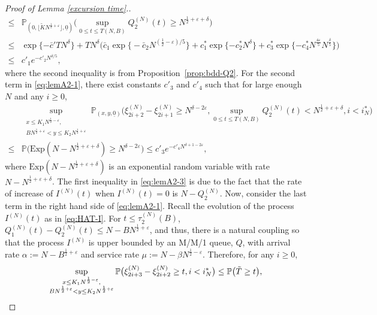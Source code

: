 \documentclass[11pt, reqno]{article}
\numberwithin{equation}{section}
\numberwithin{theorem}{section}
\begin{document}
\begin{appendix}
\begin{proof}[Proof of Lemma \ref{excursion time}.]
\begin{align}
    \leq& \mathbb{P}_{(0,\lfloor \tilde K N^{\frac{1}{2} + \varepsilon}\rfloor,\underline{0})}\Big(\sup_{0\leq t\leq T(N,B)} Q^{(N)}_2(t)\geq N^{\frac{1}{2}+\varepsilon+\delta}\Big)\nonumber\\
    \leq& \exp\{-\bar{c}'TN^{\delta}\}+TN^{\delta}\big(\bar{c}_1\exp \big\{-\bar{c}_2N^{(\frac{1}{2}-\varepsilon)/5}\big\}+c^*_1\exp\{-c^*_2N^{\delta}\}+c^*_3\exp\{-c^*_4N^{\frac{4\varepsilon}{5}}N^{\frac{\delta}{5}}\}\big)\nonumber\\
     \leq& c'_1e^{-c'_2N^{\delta/5}},
\end{align}
where the second inequality is from Proposition~\ref{prop:bdd-Q2}. For the second term in \eqref{eq:lemA2-1}, there exist constants $c'_3$ and $c'_4$ such that for large enough $N$ and any $i \ge 0$,
\begin{align}\label{eq:lemA2-3}
    &\sup_{\substack{x\leq K_1N^{\frac{1}{2} - \varepsilon},\\ BN^{\frac{1}{2} + \varepsilon} <y\leq K_2N^{\frac{1}{2} + \varepsilon}}}\mathbb{P}_{(x,y,\underline{0})}\Big(\xi^{(N)}_{2i+2}-\xi^{(N)}_{2i+1}\geq N^{\delta-2\varepsilon}, \sup_{0\leq t\leq T(N,B)} Q^{(N)}_2(t)< N^{\frac{1}{2}+\varepsilon+\delta}, i <i^*_N\Big)\nonumber\\
    \leq &\mathbb{P}\Big(\mathrm{Exp}(N-N^{\frac{1}{2}+\varepsilon+\delta})\geq N^{\delta-2\varepsilon}\Big)\leq c'_3e^{-c'_4N^{\delta + 1 - 2\varepsilon}},
\end{align}
where $\mathrm{Exp}(N-N^{\frac{1}{2}+\varepsilon+\delta})$ 
is an exponential random variable with rate $N-N^{\frac{1}{2}+\varepsilon+\delta}$. The first inequality in \eqref{eq:lemA2-3} is due to the fact that the rate of increase of $I^{(N)}(t)$ when $I^{(N)}(t)=0$ is $N-Q^{(N)}_2$. Now, consider the last term in the right hand side of \eqref{eq:lemA2-1}.
Recall the evolution of the process $I^{(N)}(t)$ as in \eqref{eq:HAT-I}.
For $t\leq \tau_2^{(N)}(B)$, $Q^{(N)}_1(t)-Q^{(N)}_2(t)\leq N-BN^{\frac{1}{2}+\varepsilon}$, and thus, there is a natural coupling so that the process $I^{(N)}$ is upper bounded by an M/M/1 queue, $Q$, with arrival rate $\alpha:=N-B^{\frac{1}{2}+\varepsilon}$ and service rate $\mu:=N-\beta N^{\frac{1}{2}-\varepsilon}$. 
Therefore, for any $i \ge 0$,
\begin{equation}\label{eq:exc-upper-bdd}
    \sup_{\substack{x\leq K_1N^{\frac{1}{2} - \varepsilon},\\ BN^{\frac{1}{2} + \varepsilon} <y\leq K_2N^{\frac{1}{2} + \varepsilon}}}\mathbb{P}\big(\xi^{(N)}_{2i+3}-\xi^{(N)}_{2i+2}\geq t, i <i^*_N\big)\leq \mathbb{P}\big(\Tilde{T}\geq t\big),

\end{equation}
\end{proof}
\end{appendix}
\end{document}
